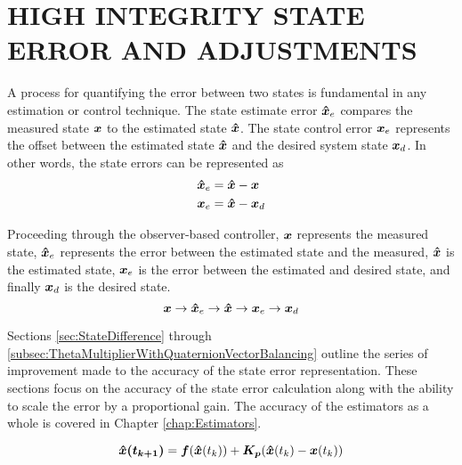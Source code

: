 
\chapter{HIGH INTEGRITY STATE ERROR AND ADJUSTMENTS}
\label{chap:StateError}

A process for quantifying the error between two states is fundamental in any estimation or control technique.  The state estimate error $\boldsymbol{\hat{x}}_e$ compares the measured state $\boldsymbol{x}$ to the estimated state $\boldsymbol{\hat{x}}$.  The state control error $\boldsymbol{x}_e$ represents the offset between the estimated state $\boldsymbol{\hat{x}}$ and the desired system state $\boldsymbol{x}_d$.  In other words, the state errors can be represented as
\begin{subequations}
  \begin{align}
    \boldsymbol{\hat{x}}_e &= \boldsymbol{\hat{x}} - \boldsymbol{x} \\
    \boldsymbol{x}_e &= \boldsymbol{\hat{x}} - \boldsymbol{x}_d
  \end{align}
  \label{eqn:StateError}
\end{subequations}

Proceeding through the observer-based controller, $\boldsymbol{x}$ represents the measured state, $\boldsymbol{\hat{x}}_e$ represents the error between the estimated state and the measured, $\boldsymbol{\hat{x}}$ is the estimated state, $\boldsymbol{x}_e$ is the error between the estimated and desired state, and finally $\boldsymbol{x}_d$ is the desired state.
\begin{equation}
  \boldsymbol{x} \to \boldsymbol{\hat{x}}_e \to \boldsymbol{\hat{x}} \to \boldsymbol{x}_e \to \boldsymbol{x}_d
\end{equation}

Sections \ref{sec:StateDifference} through \ref{subsec:ThetaMultiplierWithQuaternionVectorBalancing} outline the series of improvement made to the accuracy of the state error representation.  These sections focus on the accuracy of the state error calculation along with the ability to scale the error by a proportional gain.  The accuracy of the estimators as a whole is covered in Chapter \ref{chap:Estimators}.

\begin{equation}
  \boldsymbol{\hat{x}(t_{k+1})} = \boldsymbol{f}(\boldsymbol{\hat{x}}(t_{k})) + \boldsymbol{K_p} ( \boldsymbol{\hat{x}}(t_{k}) - \boldsymbol{x}(t_{k}) )
  \label{eqn:PEstimatorStateDiff}
\end{equation}

